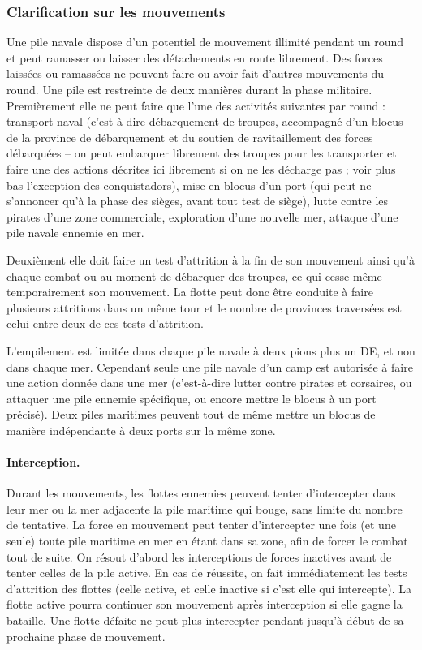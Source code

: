 \subsubsection{Clarification sur les mouvements}
Une pile navale dispose d'un potentiel de mouvement illimité
pendant un round et peut ramasser ou laisser des détachements en
route librement. Des forces laissées ou ramassées ne peuvent faire ou avoir
fait d'autres mouvements du round. Une pile est restreinte de deux
manières durant la phase militaire. Premièrement elle ne peut faire
que l'une des activités suivantes par round : transport naval
(c'est-à-dire débarquement de troupes, accompagné
d'un blocus de la province de débarquement et
du soutien de ravitaillement des forces débarquées -- on peut
embarquer librement des troupes pour les transporter et faire une
des actions décrites ici librement si on ne les décharge pas ;
voir plus bas l'exception des conquistadors), mise en
blocus d'un port (qui peut ne s'annoncer qu'à la phase des
sièges, avant tout test de siège), lutte contre les pirates d'une zone commerciale,
exploration d'une nouvelle mer, attaque d'une pile navale ennemie en mer.

Deuxièment elle doit faire un test d'attrition à la fin de son mouvement
ainsi qu'à chaque combat ou au moment de débarquer des troupes,
ce qui cesse même temporairement son mouvement. La flotte
peut donc être conduite à faire plusieurs attritions dans un même tour
et le nombre de provinces traversées est celui entre deux de ces tests
d'attrition.

L'empilement est limitée dans chaque pile navale à deux pions plus un DE,
et non dans chaque mer. Cependant seule une pile navale d'un camp est
autorisée à faire une action donnée dans une mer (c'est-à-dire lutter contre
pirates et corsaires, ou attaquer une pile ennemie spécifique, ou encore
mettre le blocus à un port précisé). Deux piles maritimes peuvent tout
de même mettre un blocus de manière indépendante à deux ports sur la
même zone.

\paragraph{Interception.}
Durant les mouvements, les flottes ennemies peuvent tenter d'intercepter dans
leur mer ou la mer adjacente la pile maritime qui bouge, sans limite du
nombre de tentative. La force en mouvement peut tenter d'intercepter
une fois (et une seule) toute pile maritime en mer en étant dans sa zone, afin de
forcer le combat tout de suite. On résout d'abord les interceptions
de forces inactives avant de tenter celles de la pile active.
En cas de réussite, on fait immédiatement les tests
d'attrition des flottes (celle active, et celle inactive si c'est elle
qui intercepte). La flotte active pourra continuer son mouvement
après interception si elle gagne la bataille. Une flotte défaite ne
peut plus intercepter pendant jusqu'à début de sa prochaine phase de
mouvement.

